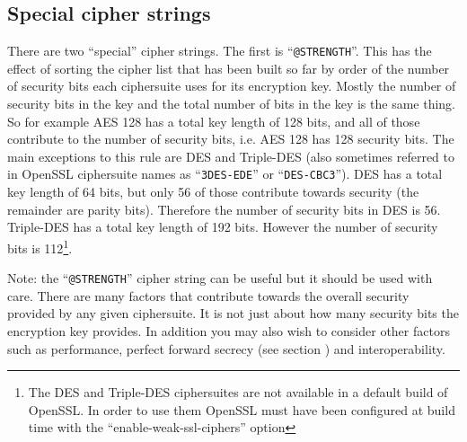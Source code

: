 \subsection{Special cipher strings}

There are two ``special'' cipher strings. The first is ``\verb!@STRENGTH!''.
This has the effect of sorting the cipher list that has been built so far by
order of the number of security bits each ciphersuite uses for its encryption
key. Mostly the number of security bits in the key and the total number of bits
in the key is the same thing. So for example AES 128 has a total key length of
128 bits, and all of those contribute to the number of security bits, i.e. AES
128 has 128 security bits. The main exceptions to this rule are DES and
Triple-DES (also sometimes referred to in OpenSSL ciphersuite names as
``\verb!3DES-EDE!'' or ``\verb!DES-CBC3!''). DES has a total key length of 64
bits, but only 56 of those contribute towards security (the remainder are parity
bits). Therefore the number of security bits in DES is 56. Triple-DES has a
total key length of 192 bits. However the number of security bits is
112\footnote{ The DES and Triple-DES ciphersuites are not available in a default
build of OpenSSL. In order to use them OpenSSL must have been configured at
build time with the ``enable-weak-ssl-ciphers'' option}.

Note: the ``\verb!@STRENGTH!'' cipher string can be useful but it should be
used with care. There are many factors that contribute towards the overall
security provided by any given ciphersuite. It is not just about how many
security bits the encryption key provides. In addition you may also wish to
consider other factors such as performance, perfect forward secrecy (see
section ) and interoperability.

